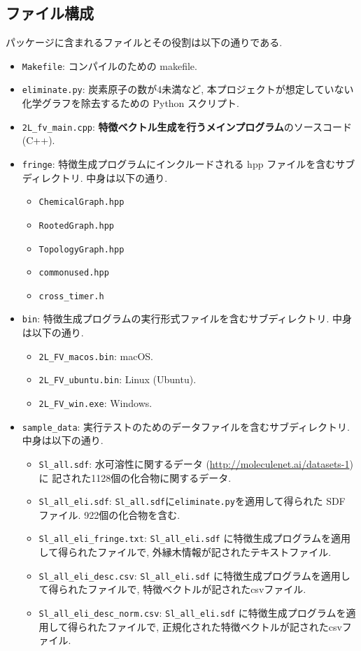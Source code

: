\documentclass[11pt, titlepage, dvipdfmx, twoside]{jarticle}
\begin{document}
\subsection{ファイル構成}
パッケージに含まれるファイルとその役割は以下の通りである. 
\begin{itemize}
\item {\tt Makefile}: コンパイルのための makefile. 
\item {\tt eliminate.py}: 炭素原子の数が4未満など, 本プロジェクトが想定していない化学グラフを除去するための Python スクリプト. 
\item {\tt 2L\_fv\_main.cpp}: {\bf 特徴ベクトル生成を行うメインプログラム}のソースコード (C++). 
\item {\tt fringe}: 特徴生成プログラムにインクルードされる hpp ファイルを含むサブディレクトリ.
  中身は以下の通り.
  \begin{itemize}
  \item {\tt ChemicalGraph.hpp}
  \item {\tt RootedGraph.hpp}
  \item {\tt TopologyGraph.hpp}
  \item {\tt commonused.hpp}
  \item {\tt cross\_timer.h}
  \end{itemize}
\item {\tt bin}: 特徴生成プログラムの実行形式ファイルを含むサブディレクトリ.
  中身は以下の通り.
  \begin{itemize}
  \item {\tt 2L\_FV\_macos.bin}: macOS.
  \item {\tt 2L\_FV\_ubuntu.bin}: Linux (Ubuntu).
  \item {\tt 2L\_FV\_win.exe}: Windows.
  \end{itemize}
\item {\tt sample\_data}: 実行テストのためのデータファイルを含むサブディレクトリ. 中身は以下の通り.
  \begin{itemize}
  \item {\tt Sl\_all.sdf}: 
    水可溶性に関するデータ (\url{http://moleculenet.ai/datasets-1}) に
    記された1128個の化合物に関するデータ.  
  \item {\tt Sl\_all\_eli.sdf}: {\tt Sl\_all.sdf}に{\tt eliminate.py}を適用して得られた SDF ファイル. 922個の化合物を含む.
  \item {\tt Sl\_all\_eli\_fringe.txt}: {\tt Sl\_all\_eli.sdf} に特徴生成プログラムを適用して得られたファイルで, 外縁木情報が記されたテキストファイル. 
  \item {\tt Sl\_all\_eli\_desc.csv}: {\tt Sl\_all\_eli.sdf} に特徴生成プログラムを適用して得られたファイルで, 特徴ベクトルが記されたcsvファイル. 
  \item {\tt Sl\_all\_eli\_desc\_norm.csv}: {\tt Sl\_all\_eli.sdf} に特徴生成プログラムを適用して得られたファイルで, 正規化された特徴ベクトルが記されたcsvファイル. 
  \end{itemize}
\end{itemize}
\end{document}
